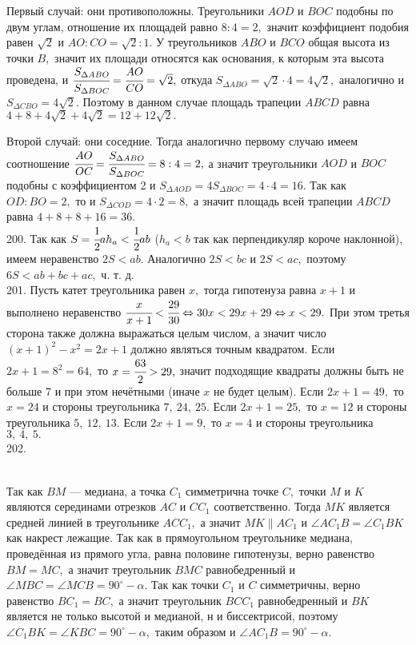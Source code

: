 Первый случай: они противоположны. Треугольники $AOD$ и $BOC$ подобны по двум углам, отношение их площадей равно $8:4=2,$ значит коэффициент подобия равен $\sqrt{2}$ и $AO:CO=\sqrt{2}:1.$ У треугольников $ABO$ и $BCO$ общая высота из точки $B,$ значит их площади относятся как основания, к которым эта высота проведена, и $\cfrac{S_{\Delta ABO}}{S_{\Delta BOC}}=\cfrac{AO}{CO}=\sqrt{2},$ откуда $S_{\Delta ABO}=\sqrt{2}\cdot4=4\sqrt{2},$ аналогично и $S_{\Delta CBO}=4\sqrt{2}.$ Поэтому в данном случае площадь трапеции $ABCD$ равна $4+8+4\sqrt{2}+4\sqrt{2}=12+12\sqrt{2}.$

Второй случай: они соседние. Тогда аналогично первому случаю имеем соотношение $\cfrac{AO}{OC}=\cfrac{S_{\Delta ABO}}{S_{\Delta BOC}}=8:4=2,$ а значит треугольники $AOD$ и $BOC$ подобны с коэффициентом 2 и $S_{\Delta AOD}=4S_{\Delta BOC}=4\cdot4=16.$ Так как $OD:BO=2,$ то и $S_{\Delta COD}=4\cdot2=8,$ а значит площадь всей трапеции $ABCD$ равна $4+8+8+16=36.$\\
200. Так как $S=\cfrac{1}{2}a h_a<\cfrac{1}{2}ab$ ($h_a<b$ так как перпендикуляр короче наклонной), имеем неравенство $2S<ab.$ Аналогично $2S<bc$ и $2S<ac,$ поэтому $6S<ab+bc+ac,$ ч. т. д.\\
201. Пусть катет треугольника равен $x,$ тогда гипотенуза равна $x+1$ и выполнено неравенство $\cfrac{x}{x+1}<\cfrac{29}{30}\Leftrightarrow 30x<29x+29
\Leftrightarrow x<29.$ При этом третья сторона также должна выражаться целым числом, а значит число $(x+1)^2-x^2=2x+1$ должно являться точным квадратом.
Если $2x+1=8^2=64,$ то $x=\cfrac{63}{2}>29,$ значит подходящие квадраты должны быть не больше 7 и при этом нечётными (иначе $x$ не будет целым). Если $2x+1=49,$ то $x=24$ и стороны треугольника $7,\ 24,\ 25.$ Если $2x+1=25,$ то $x=12$ и стороны треугольника $5,\ 12,\ 13.$ Если $2x+1=9,$ то $x=4$ и стороны треугольника $3,\ 4,\ 5.$\\
202. \begin{figure}[ht!]
\end{figure}\\
Так как $BM$ --- медиана, а точка $C_1$ симметрична точке $C,$ точки $M$ и $K$ являются серединами отрезков $AC$ и $CC_1$ соответственно. Тогда $MK$ является средней линией в треугольнике $ACC_1,$ а значит $MK\parallel AC_1$ и $\angle AC_1B=\angle C_1BK$ как накрест лежащие. Так как в прямоугольном треугольнике медиана, проведённая из прямого угла, равна половине гипотенузы, верно равенство $BM=MC,$ а значит треугольник $BMC$ равнобедренный и $\angle MBC=\angle MCB=90^\circ-\alpha.$ Так как точки $C_1$ и $C$ симметричны, верно равенство $BC_1=BC,$ а значит треугольник $BCC_1$ равнобедренный и $BK$ является не только высотой и медианой, н и биссектрисой, поэтому $\angle C_1BK=\angle KBC=90^\circ-\alpha,$ таким образом и $\angle AC_1B=90^\circ-\alpha.$\\

